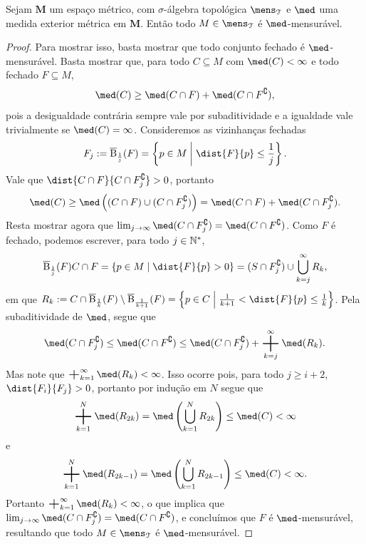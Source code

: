 \begin{prop}
\label{prop:criterio.mensur.med.metrica}
Sejam $\bm M$ um espaço métrico, com $\sigma$-álgebra topológica $\mens_\topo$ e $\med$ uma medida exterior métrica em $\bm M$. Então todo $M \in \mens_\topo$ é $\med$-mensurável.
\end{prop}
\begin{proof}
Para mostrar isso, basta mostrar que todo conjunto fechado é $\med$-mensurável. Basta mostrar que, para todo $C \subseteq M$ com $\med(C) < \infty$ e todo fechado $F \subseteq M$,
	\begin{equation*}
	\med(C) \geq \med(C \cap F) + \med(C \cap F^\complement),
	\end{equation*}
pois a desigualdade contrária sempre vale por subaditividade e a igualdade vale trivialmente se $\med(C) = \infty$. Consideremos as vizinhanças fechadas
	\begin{equation*}
	F_j := \overline\bola_{\frac{1}{j}}(F) = \set{p \in M}{\dist{F}{p} \leq \frac{1}{j}}.
	\end{equation*}
Vale que $\dist{C \cap F}{C \cap F_j^\complement} > 0$, portanto
	\begin{equation*}
	\med(C) \geq \med\left( (C \cap F) \cup (C \cap F_j^\complement) \right) = \med(C \cap F) + \med(C \cap F_j^\complement).
	\end{equation*}
Resta mostrar agora que $\lim_{j \conv \infty} \med(C \cap F_j^\complement) = \med(C \cap F^\complement)$. Como $F$ é fechado, podemos escrever, para todo $j \in \mathbb{N}^*$,
	\begin{equation*}\overline\bola_{\frac{1}{j}}(F)
	C \cap F = \set{p \in M}{\dist{F}{p} > 0} = (S \cap F_j^\complement) \cup \bigcup_{k=j}^\infty R_k,
	\end{equation*}
em que $R_k := C \cap \overline\bola_{\frac{1}{k}}(F) \setminus \overline\bola_{\frac{1}{k+1}}(F) = \set{p \in C}{\frac{1}{k+1} < \dist{F}{p} \leq \frac{1}{k}}$. Pela subaditividade de $\med$, segue que
	\begin{equation*}
	\med(C \cap F_j^\complement) \leq \med(C \cap F^\complement) \leq \med(C \cap F_j^\complement) + \sum_{k=j}^\infty \med(R_k).
	\end{equation*}
Mas note que $\sum_{k=1}^\infty \med(R_k) < \infty$. Isso ocorre pois, para todo $j \geq i+2$, $\dist{F_i}{F_j} > 0$, portanto por indução em $N$ segue que
	\begin{equation*}
	\sum_{k=1}^N \med(R_{2k}) = \med\left( \bigcup_{k=1}^N R_{2k} \right) \leq \med(C) < \infty
	\end{equation*}
e
	\begin{equation*}
	\sum_{k=1}^N \med(R_{2k-1}) = \med\left( \bigcup_{k=1}^N R_{2k-1} \right) \leq \med(C) < \infty.
	\end{equation*}
Portanto $\sum_{k=1}^\infty \med(R_k) < \infty$, o que implica que $\lim_{j \conv \infty} \med(C \cap F_j^\complement) = \med(C \cap F^\complement)$, e concluímos que $F$ é $\med$-mensurável, resultando que todo $M \in \mens_\topo$ é $\med$-mensurável.
\end{proof}

